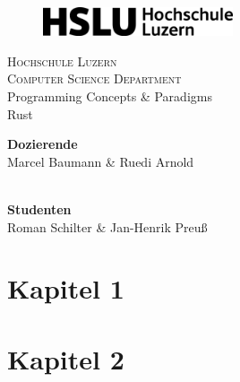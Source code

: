 \documentclass[10.5pt]{article}
\begin{document}


    \begin{titlepage}
        \begin{figure}[t]
            \centering\includegraphics[width=0.5\textwidth]{HSLU2022logo}
            \label{fig:hslu-title}
        \end{figure}

        \begin{center}
            \textsc{\LARGE{Hochschule Luzern\\}}
            \textsc{ \LARGE{Computer Science Department\\ }}
            \vspace{40mm}
            \textnormal
            Programming Concepts \& Paradigms\\
            \vspace{4mm}
            \fontsize{10mm}{7mm}\selectfont
            \textup{Rust}\\
        \end{center}

        \vspace{25mm}

        \begin{minipage}[t]{0.47\textwidth}
            \textnormal{\large{\bf Dozierende\\}}
            {\large Marcel Baumann \& Ruedi Arnold\\ \\}
        \end{minipage}\hfill\begin{minipage}[t]{0.47\textwidth}
                                \raggedleft
                                \textnormal{\large{\bf Studenten\\}}
                                {\large Roman Schilter \& Jan-Henrik Preuß}
        \end{minipage}

        \vspace{20mm}


    \end{titlepage}


    \newpage



    \section{Kapitel 1}
    \lipsum[10]


    \section{Kapitel 2}
\end{document}
